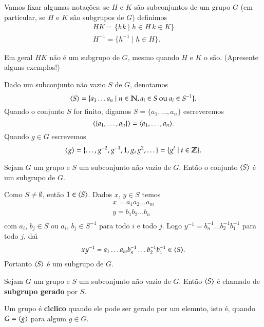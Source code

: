 Vamos fixar algumas nota\c{c}\~oes: se $H$ e $K$ s\~ao subconjuntos de um grupo $G$ (em particular, se $H$ e $K$ s\~ao subgrupos de $G$) definimos
\begin{align*}
	HK = \{hk \mid h \in H\, k \in K\}\\
	H^{-1} = \{h^{-1} \mid h \in H\}.
\end{align*}

Em geral $HK$ n\~ao \'e um subgrupo de $G$, mesmo quando $H$ e $K$ o s\~ao. (Apresente alguns exemplos!)

Dado um subconjunto n\~ao vazio $S$ de $G$, denotamos
\[
	\langle{S}\rangle = \{a_1\dots a_n \mid n \in \mathbb{N}, a_i \in S \mbox{ ou } a_i \in S^{-1}\}.
\]
Quando o conjunto $S$ for finito, digamos $S = \{a_1, \dots, a_n\}$ escreveremos
\[
	\langle{\{a_1,\dots, a_n\}}\rangle = \langle{a_1,\dots,a_n}\rangle.
\]
Quando $g \in G$ escrevemos
\[
	\langle{g}\rangle = \{\dots, g^{-2}, g^{-1}, 1, g, g^2,\dots\} = \{g^t \mid t \in \mathbb{Z}\}.
\]

\begin{proposicao}
	Sejam $G$ um grupo e $S$ um subconjunto n\~ao vazio de $G$. Ent\~ao o conjunto $\langle{S}\rangle$ \'e um subgrupo de $G$.
\end{proposicao}
\begin{prova}
	Como $S \ne \emptyset$, ent\~ao $1 \in \langle{S}\rangle$. Dados $x$, $y \in S$ temos
	\begin{align*}
		x = a_1a_2\dots a_m\\
		y = b_1b_2\dots b_n\\
	\end{align*}
	com $a_i$, $b_j \in S$ ou $a_i$, $b_j \in S^{-1}$ para todo $i$ e todo $j$. Logo $y^{-1} = b_n^{-1}\dots b_2^{-1}b_1^{-1}$ para todo $j$, da{\'\i}
	\[
		xy^{-1} = a_1\dots a_mb_{n}^{-1}\dots b_2^{-1}b_1^{-1} \in \langle{S}\rangle.
	\]
	Portanto $\langle{S}\rangle$ \'e um subgrupo de $G$.
\end{prova}

\begin{definicao}
	Sejam $G$ um grupo e $S$ um subconjunto n\~ao vazio de $G$. Ent\~ao $\langle{S}\rangle$ \'e chamado de \textbf{subgrupo gerado} por $S$.
\end{definicao}

\begin{definicao}
	Um grupo \'e \textbf{c{\'\i}clico} quando ele pode ser gerado por um elemnto, isto \'e, quando $G = \langle{g}\rangle$ para algum $g \in G$.
\end{definicao}


